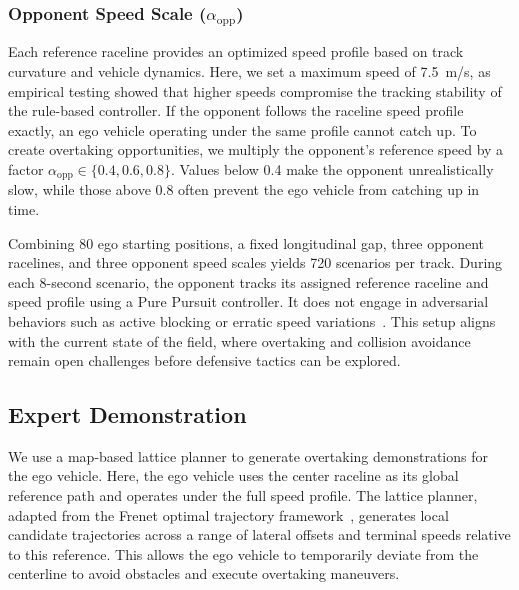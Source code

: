 \documentclass[letterpaper,10 pt,conference]{ieeeconf}
\begin{document}
\subsubsection{Opponent Speed Scale (\(\alpha_{\mathrm{opp}}\))}
Each reference raceline provides an optimized speed profile based on track curvature and vehicle dynamics. Here, we set a maximum speed of 7.5~m/s, as empirical testing showed that higher speeds compromise the tracking stability of the rule-based controller. If the opponent follows the raceline speed profile exactly, an ego vehicle operating under the same profile cannot catch up. To create overtaking opportunities, we multiply the opponent's reference speed by a factor \(\alpha_{\mathrm{opp}}\in\{0.4,0.6,0.8\}\). Values below 0.4 make the opponent unrealistically slow, while those above 0.8 often prevent the ego vehicle from catching up in time.

Combining 80 ego starting positions, a fixed longitudinal gap, three opponent racelines, and three opponent speed scales yields 720 scenarios per track. During each 8-second scenario, the opponent tracks its assigned reference raceline and speed profile using a Pure Pursuit controller. It does not engage in adversarial behaviors such as active blocking or erratic speed variations~\cite{zheng2025bridginggapdiscreteagent}. This setup aligns with the current state of the field, where overtaking and collision avoidance remain open challenges before defensive tactics can be explored.

\subsection{Expert Demonstration}

We use a map-based lattice planner to generate overtaking demonstrations for the ego vehicle. Here, the ego vehicle uses the center raceline as its global reference path and operates under the full speed profile. The lattice planner, adapted from the Frenet optimal trajectory framework~\cite{sakai2018pythonrobotics}, generates local candidate trajectories across a range of lateral offsets and terminal speeds relative to this reference. This allows the ego vehicle to temporarily deviate from the centerline to avoid obstacles and execute overtaking maneuvers.
\end{document}
